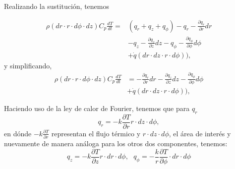 \documentclass{beamer}
\begin{document}
\begin{frame}{}
Realizando la sustitución, tenemos
\begin{block}{}
	\begin{equation*}
	\begin{split}
	\rho (dr \cdot r \cdot d\phi \cdot dz) C_p \frac{dT}{dt} = & (q_r + q_z + q_{\phi}) - q_r - \frac{\partial q_r}{\partial r} dr \\
	&- q_{z} - \frac{\partial q_{z}}{\partial z} dz - q_{\phi} - \frac{\partial q_{\phi}}{\partial \phi} d\phi \\
	&+ \dot{q}(dr \cdot dz \cdot r  \cdot d\phi)),
	\end{split}
	\end{equation*}
	y simplificando,
	\begin{equation}
	\begin{split}
	\rho (dr \cdot r \cdot d\phi \cdot dz) C_p \frac{dT}{dt} &= - \frac{\partial q_r}{\partial r} dr - \frac{\partial q_{z}}{\partial z} dz - \frac{\partial q_{\phi}}{\partial \phi} d\phi \\
	&+ \dot{q}(dr \cdot dz \cdot r  \cdot d\phi)),
	\end{split}
	\label{eq:heat_big_2}
	\end{equation}
\end{block}

\end{frame}

\begin{frame}{}

\begin{block}{}
	Haciendo uso de la ley de calor de Fourier, tenemos que para $q_r$
	$$q_r = -k \frac{\partial T}{\partial r} r \cdot dz \cdot d\phi,$$
	en dónde $-k \frac{\partial T}{\partial r}$ representan el flujo térmico y $r \cdot dz \cdot d\phi$, el área de interés y nuevamente de manera análoga para los otros dos componentes, tenemos:
	$$q_z = -k \frac{\partial T}{\partial z} r \cdot dr \cdot d\phi, \text{   } q_\phi = -\frac{k}{r} \frac{\partial T}{\partial \phi} \cdot dr \cdot d\phi$$
\end{block}

\end{frame}
\end{document}
